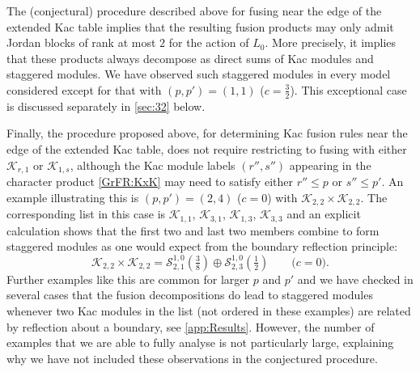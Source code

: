 \documentclass[a4paper,reqno,12pt]{report}
\theoremstyle{definition}
\numberwithin{equation}{section}
\newcommand{\Kac}[1]{\mathcal{K}_{#1}}       %
\newcommand{\Stag}[2]{\mathcal{S}_{#1}^{#2}} %
\newcommand{\fuse}{\mathbin{\times}}                                            %
\renewcommand{\le}{\leqslant}
\theoremstyle{plain}
\begin{document}
The (conjectural) procedure described above for fusing near the edge of the extended Kac table implies that the resulting fusion products may only admit Jordan blocks of rank at most $2$ for the action of $L_0$.  More precisely, it implies that these products always decompose as direct sums of Kac modules and staggered modules.  We have observed such staggered modules in every model considered except for that with $(p,p')=(1,1)$ ($c=\frac{3}{2}$).  This exceptional case is discussed separately in \cref{sec:32} below.

Finally, the procedure proposed above, for determining Kac fusion rules near the edge of the extended Kac table, does not require restricting to fusing with either $\Kac{r,1}$ or $\Kac{1,s}$, although the Kac module labels $(r'',s'')$ appearing in the character product \eqref{GrFR:KxK} may need to satisfy either $r'' \le p$ or $s'' \le p'$.  An example illustrating this is $(p,p')=(2,4)$ ($c=0$) with $\Kac{2,2} \fuse \Kac{2,2}$.  The corresponding list in this case is $\Kac{1,1}$, $\Kac{3,1}$, $\Kac{1,3}$, $\Kac{3,3}$ and an explicit calculation shows that the first two and last two members combine to form staggered modules as one would expect from the boundary reflection principle:
\begin{equation}
\Kac{2,2} \fuse \Kac{2,2} = \Stag{2,1}{1,0}(\tfrac{3}{8}) \oplus \Stag{2,3}{1,0}(\tfrac{1}{2}) \qquad \text{(\(c = 0\)).}
\end{equation}
Further examples like this are common for larger $p$ and $p'$ and we have checked in several cases that the fusion decompositions do lead to staggered modules whenever two Kac modules in the list (not ordered in these examples) are related by reflection about a boundary, see \cref{app:Results}.  However, the number of examples that we are able to fully analyse is not particularly large, explaining why we have not included these observations in the conjectured procedure.
\end{document}
